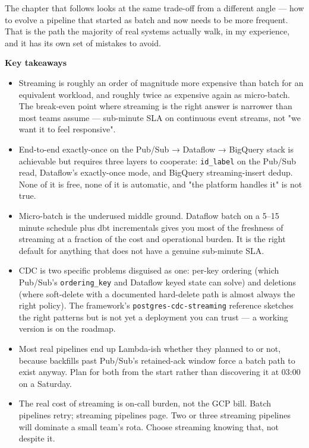 \documentclass[
  11pt,
  british,
  oneside]{book}
\begin{document}
The chapter that follows looks at the same trade-off from a different
angle --- how to evolve a pipeline that started as batch and now needs
to be more frequent. That is the path the majority of real systems
actually walk, in my experience, and it has its own set of mistakes to
avoid.

\begin{takeaways}
\textbf{Key takeaways}
\begin{itemize}
  \item Streaming is roughly an order of magnitude more expensive than batch for an equivalent workload, and roughly twice as expensive again as micro-batch. The break-even point where streaming is the right answer is narrower than most teams assume — sub-minute SLA on continuous event streams, not "we want it to feel responsive".
  \item End-to-end exactly-once on the Pub/Sub → Dataflow → BigQuery stack is achievable but requires three layers to cooperate: \texttt{id\_label} on the Pub/Sub read, Dataflow's exactly-once mode, and BigQuery streaming-insert dedup. None of it is free, none of it is automatic, and "the platform handles it" is not true.
  \item Micro-batch is the underused middle ground. Dataflow batch on a 5–15 minute schedule plus dbt incrementals gives you most of the freshness of streaming at a fraction of the cost and operational burden. It is the right default for anything that does not have a genuine sub-minute SLA.
  \item CDC is two specific problems disguised as one: per-key ordering (which Pub/Sub's \texttt{ordering\_key} and Dataflow keyed state can solve) and deletions (where soft-delete with a documented hard-delete path is almost always the right policy). The framework's \texttt{postgres-cdc-streaming} reference sketches the right patterns but is not yet a deployment you can trust — a working version is on the roadmap.
  \item Most real pipelines end up Lambda-ish whether they planned to or not, because backfills past Pub/Sub's retained-ack window force a batch path to exist anyway. Plan for both from the start rather than discovering it at 03:00 on a Saturday.
  \item The real cost of streaming is on-call burden, not the GCP bill. Batch pipelines retry; streaming pipelines page. Two or three streaming pipelines will dominate a small team's rota. Choose streaming knowing that, not despite it.
\end{itemize}
\end{takeaways}
\newpage
\end{document}
